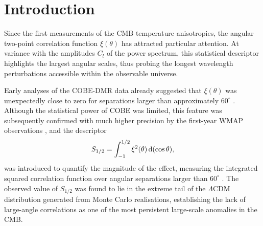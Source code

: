 \documentclass[apj,twocolumn,numberedappendix]{openjournal}
\newcommand{\dd}{\ensuremath{{\rm d}}}
\begin{document}

\section{Introduction}\label{sec-intro}

Since the first measurements of the CMB temperature anisotropies, the angular two-point correlation function $\xi(\theta)$ has attracted particular attention.
At variance with the amplitudes $C_l$ of the power spectrum, this statistical descriptor highlights the largest angular scales, thus probing the longest wavelength perturbations accessible within the observable universe.

Early analyses of the COBE-DMR data already suggested that $\xi(\theta)$ was unexpectedly close to zero for separations larger than approximately $60^\circ$ \citep{Hinshaw_1996}.
Although the statistical power of COBE was limited, this feature was subsequently confirmed with much higher precision by the first-year WMAP observations \citep{Spergel_2003}, and the descriptor
\begin{equation}
S_{1/2} = \int_{-1}^{1/2} \xi^2(\theta)\,\dd(\cos\theta),
\end{equation}
was introduced to quantify the magnitude of the effect, measuring the integrated squared correlation function over angular separations larger than $60^\circ$ \citep{Spergel_2003}.
The observed value of $S_{1/2}$ was found to lie in the extreme tail of the $\Lambda$CDM distribution generated from Monte Carlo realisations, establishing the lack of large-angle correlations as one of the most persistent large-scale anomalies in the CMB.

%
\end{document}
